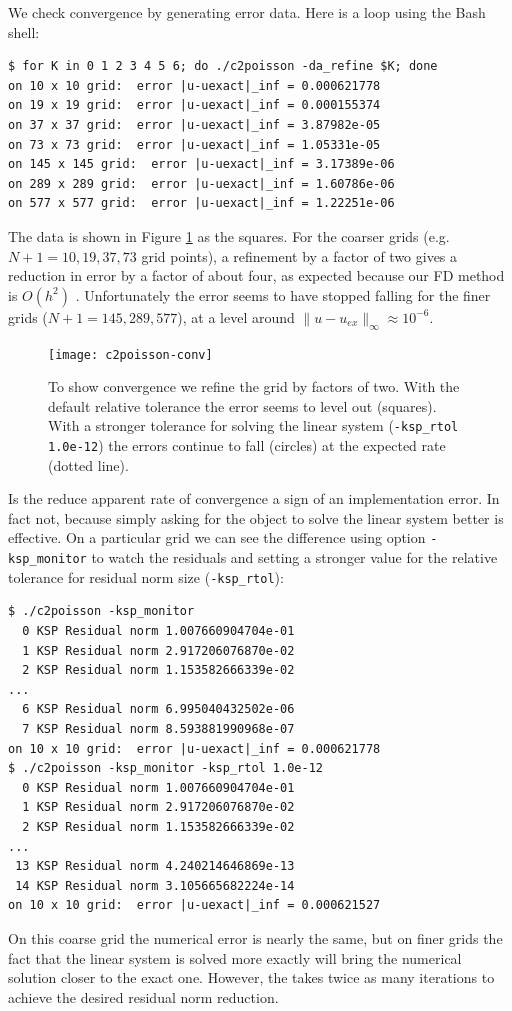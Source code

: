 We check convergence by generating error data.  Here is a loop using the Bash shell:
\begin{Verbatim}[fontsize=\small]
$ for K in 0 1 2 3 4 5 6; do ./c2poisson -da_refine $K; done
on 10 x 10 grid:  error |u-uexact|_inf = 0.000621778
on 19 x 19 grid:  error |u-uexact|_inf = 0.000155374
on 37 x 37 grid:  error |u-uexact|_inf = 3.87982e-05
on 73 x 73 grid:  error |u-uexact|_inf = 1.05331e-05
on 145 x 145 grid:  error |u-uexact|_inf = 3.17389e-06
on 289 x 289 grid:  error |u-uexact|_inf = 1.60786e-06
on 577 x 577 grid:  error |u-uexact|_inf = 1.22251e-06
\end{Verbatim}
The data is shown in Figure \ref{fig:c2poisson-conv} as the squares.  For the coarser grids (e.g.~$N+1=10,19,37,73$ grid points), a refinement by a factor of two gives a reduction in error by a factor of about four, as expected because our FD method is $O(h^2)$ \citep{MortonMayers}.  Unfortunately the error seems to have stopped falling for the finer grids ($N+1=145,289,577$), at a level around $\|u-u_{ex}\|_\infty \approx 10^{-6}$.

\begin{figure}
\bigskip
\texttt{[image: c2poisson-conv]}
\caption{To show convergence we refine the \pDM grid by factors of two.  With the default \pKSP relative tolerance the error seems to level out (squares).  With a stronger tolerance for solving the linear system (\texttt{-ksp\_rtol 1.0e-12}) the errors continue to fall (circles) at the expected rate (dotted line).}
\label{fig:c2poisson-conv}
\end{figure}

Is the reduce apparent rate of convergence a sign of an implementation error.  In fact not, because simply asking for the \pKSP object to solve the linear system better is effective.  On a particular grid we can see the difference using option \texttt{-ksp\_monitor} to watch the residuals and setting a stronger value for the \pKSP relative tolerance for residual norm size (\texttt{-ksp\_rtol}):
\begin{Verbatim}[fontsize=\small]
$ ./c2poisson -ksp_monitor
  0 KSP Residual norm 1.007660904704e-01 
  1 KSP Residual norm 2.917206076870e-02 
  2 KSP Residual norm 1.153582666339e-02 
... 
  6 KSP Residual norm 6.995040432502e-06 
  7 KSP Residual norm 8.593881990968e-07 
on 10 x 10 grid:  error |u-uexact|_inf = 0.000621778
$ ./c2poisson -ksp_monitor -ksp_rtol 1.0e-12
  0 KSP Residual norm 1.007660904704e-01 
  1 KSP Residual norm 2.917206076870e-02 
  2 KSP Residual norm 1.153582666339e-02 
...
 13 KSP Residual norm 4.240214646869e-13 
 14 KSP Residual norm 3.105665682224e-14 
on 10 x 10 grid:  error |u-uexact|_inf = 0.000621527
\end{Verbatim}
On this coarse grid the numerical error is nearly the same, but on finer grids the fact that the linear system is solved more exactly will bring the numerical solution closer to the exact one.  However, the \pKSP takes twice as many iterations to achieve the desired residual norm reduction.

